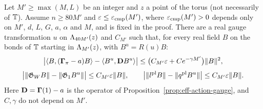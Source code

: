 \begin{lemma}\label{lem:local-comparison}
Let $M'\ge\max(M,L)$ be an integer and $z$ a point of the torus (not necessarily of $\mathbb T$). Assume $n\ge80M'$ and $\varepsilon\le\varepsilon_{\rm cmp}(M')$, where $\varepsilon_{\rm cmp}(M')>0$ depends only on $M'$, $d$, $L$, $G$, $a$, $\alpha$ and $M$, and is fixed in the proof. There are a real gauge transformation $u$ on $\Lambda_{40M'}(z)$ and $C_{M'}$ such that, for every real field $B$ on the bonds of $\mathbb T$ starting in $\Lambda_{M'}(z)$, with $B^u=R(u)B$:
\[
\big|\langle B,(\boldsymbol\Gamma_\pi-a)B\rangle-\langle B^u,\mathbf D B^u\rangle\big|\le\big(C_{M'}\varepsilon+Ce^{-\gamma M'}\big)\|B\|^2,
\]
\[
\big|\|\mathfrak G_WB\|-\|\mathfrak G_1B^u\|\big|\le C_{M'}\varepsilon\|B\|,\qquad\big|\|l^{\rm pl}B\|-\|q^{\rm pl}B^u\|\big|\le C_{M'}\varepsilon\|B\| .
\]
Here $\mathbf D=\boldsymbol\Gamma(1)-a$ is the operator of Proposition~\ref{prop:eff-action-gauge}, and $C,\gamma$ do not depend on $M'$.
\end{lemma}

